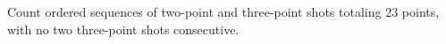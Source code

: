 Count ordered sequences of two-point and three-point shots totaling 23 points, with no two three-point shots consecutive.
